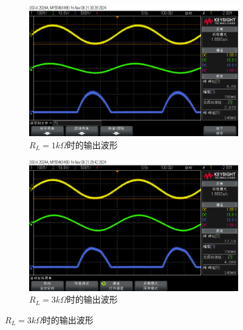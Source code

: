 \documentclass[UTF8]{ctexart}
\begin{document}
\begin{figure}[H]
    \centering
    \begin{subfigure}[c]{0.45\textwidth}
        \centering
        \includegraphics[width=\textwidth]{pics/71.png}
        \caption{$R_L=1k\Omega$时的输出波形}\label{fig:71}
    \end{subfigure}
    \begin{subfigure}[c]{0.45\textwidth}
        \centering
        \includegraphics[width=\textwidth]{pics/72.png}
        \caption{$R_L=3k\Omega$时的输出波形}\label{fig:72}
    \end{subfigure}


\end{figure}
\end{document}
